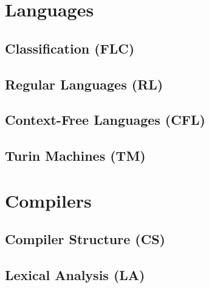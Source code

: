 \documentclass{wileySev}
\begin{document}

    \part[Languages]
    {Languages}

        \chapter[Classification (FLC)]
        {Classification (FLC)}
        

        \chapter[Regular Languages (RL)]
        {Regular Languages (RL)}

        \chapter[Context-Free Languages (CFL)]
        {Context-Free Languages (CFL)}

        \chapter[Turin Machines (TM)]
        {Turin Machines (TM)}

    \part[Compilers]
    {Compilers}

        \chapter[Compiler Structure (CS)]
        {Compiler Structure (CS)}

        \chapter[Lexical Analysis (LA)]
        {Lexical Analysis (LA)}
\end{document}
